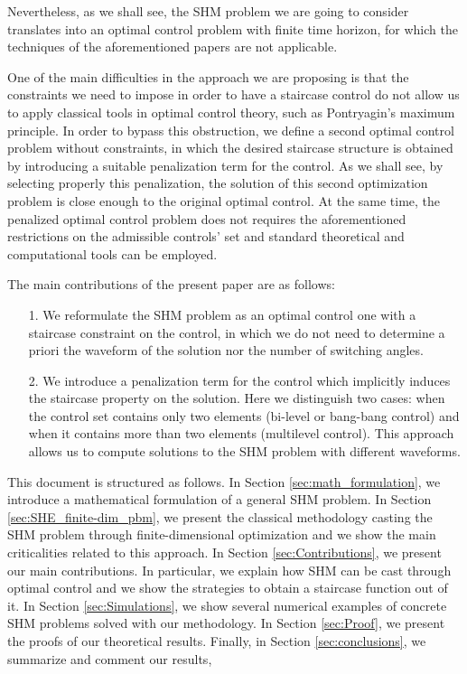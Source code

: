 \documentclass[twocolumn]{autart}    %
\begin{document}
Nevertheless, as we shall see, the SHM problem we are going to consider translates into an optimal control problem with finite time horizon, for which the techniques of the aforementioned papers are not applicable. 

One of the main difficulties in the approach we are proposing is that the constraints we need to impose in order to have a staircase control do not allow us to apply classical tools in optimal control theory, such as Pontryagin's maximum principle. In order to bypass this obstruction, we define a second optimal control problem without constraints, in which the desired staircase structure is obtained by introducing a suitable penalization term for the control. As we shall see, by selecting properly this penalization, the solution of this second optimization problem is close enough to the original optimal control. At the same time, the penalized optimal control problem does not requires the aforementioned restrictions on the admissible controls' set and standard theoretical and computational tools can be employed. 

The main contributions of the present paper are as follows:
\begin{enumerate}
    \item[1.] We reformulate the SHM problem as an optimal control one with a staircase constraint on the control, in which we do not need to determine a priori the waveform of the solution nor the number of switching angles.  
    \item[2.] We introduce a penalization term for the control which implicitly induces the staircase property on the solution. Here we distinguish two cases: when the control set contains only two elements (bi-level or bang-bang control) and when it contains more than two elements (multilevel control). This approach allows us to compute solutions to the SHM problem with different waveforms.
\end{enumerate}

This document is structured as follows. In Section \ref{sec:math_formulation}, we introduce a mathematical formulation of a general SHM problem. 
In Section \ref{sec:SHE_finite-dim_pbm}, we present the classical methodology casting the SHM problem through finite-dimensional optimization and we show the main criticalities related to this approach. In Section \ref{sec:Contributions}, we present our main contributions. In particular, we explain how SHM can be cast through optimal control and we show the strategies to obtain a staircase function out of it. In Section \ref{sec:Simulations}, we show several numerical examples of concrete SHM problems solved with our methodology. In Section \ref{sec:Proof}, we present the proofs of our theoretical results. Finally, in Section \ref{sec:conclusions}, we summarize and comment our results,  
\end{document}
